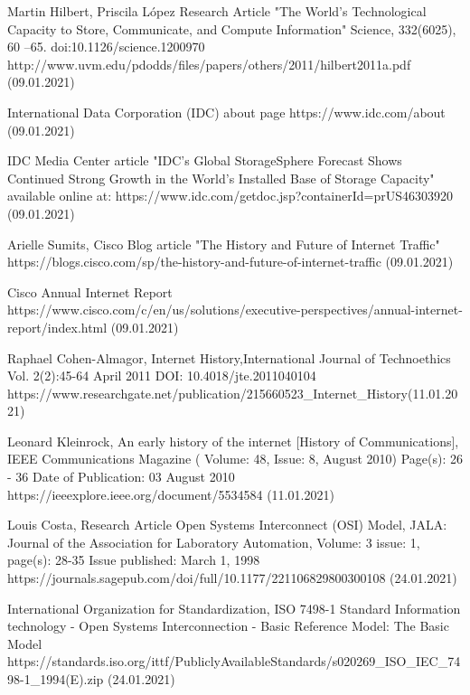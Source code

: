 \documentclass[magisterska,en]{pracamgr}
\begin{document}
\begin{thebibliography}{9}
Martin Hilbert, Priscila López
Research Article "The World’s Technological Capacity to Store, Communicate, and Compute Information" Science, 332(6025), 60 –65. doi:10.1126/science.1200970
http://www.uvm.edu/pdodds/files/papers/others/2011/hilbert2011a.pdf (09.01.2021)

International Data Corporation (IDC) about page
https://www.idc.com/about (09.01.2021)

IDC Media Center article "IDC's Global StorageSphere Forecast Shows Continued Strong Growth in the World's Installed Base of Storage Capacity" available online at: https://www.idc.com/getdoc.jsp?containerId=prUS46303920 (09.01.2021)

Arielle Sumits, Cisco Blog article "The History and Future of Internet Traffic"
https://blogs.cisco.com/sp/the-history-and-future-of-internet-traffic (09.01.2021)

Cisco Annual Internet Report
https://www.cisco.com/c/en/us/solutions/executive-perspectives/annual-internet-report/index.html (09.01.2021)

Raphael Cohen-Almagor, Internet History,International Journal of Technoethics Vol. 2(2):45-64
April 2011 
DOI: 10.4018/jte.2011040104
https://www.researchgate.net/publication/215660523\_Internet\_History(11.01.2021)



Leonard Kleinrock, An early history of the internet [History of Communications],  IEEE Communications Magazine ( Volume: 48, Issue: 8, August 2010) Page(s): 26 - 36
Date of Publication: 03 August 2010 
https://ieeexplore.ieee.org/document/5534584 (11.01.2021)
 
 
Louis Costa, Research Article Open Systems Interconnect (OSI) Model, JALA: Journal of the Association for Laboratory Automation, Volume: 3 issue: 1, page(s): 28-35
Issue published: March 1, 1998 
https://journals.sagepub.com/doi/full/10.1177/221106829800300108 (24.01.2021)

International Organization for Standardization, ISO 7498-1 Standard Information technology - Open Systems Interconnection - Basic Reference Model: The Basic Model
https://standards.iso.org/ittf/PubliclyAvailableStandards/s020269\_ISO\_IEC\_7498-1\_1994(E).zip (24.01.2021)
\end{thebibliography}
\end{document}
